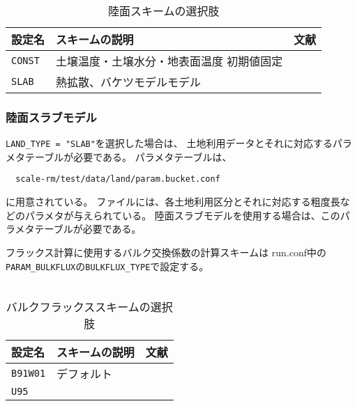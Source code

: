 \begin{table}[h]
\begin{center}
  \caption{陸面スキームの選択肢}
  \label{tab:nml_land}
  \begin{tabularx}{150mm}{lXX} \hline
    \rowcolor[gray]{0.9}  設定名 & スキームの説明 & 文献\\ \hline
      \verb|CONST| & 土壌温度・土壌水分・地表面温度 初期値固定 &  \\
      \verb|SLAB|  & 熱拡散、バケツモデルモデル   &  \\
    \hline
  \end{tabularx}
\end{center}
\end{table}



\subsubsection{陸面スラブモデル}
\verb|LAND_TYPE = "SLAB"|を選択した場合は、
土地利用データとそれに対応するパラメタテーブルが必要である。
パラメタテーブルは、
\begin{verbatim}
  scale-rm/test/data/land/param.bucket.conf
\end{verbatim}
に用意されている。
ファイルには、各土地利用区分とそれに対応する粗度長などのパラメタが与えられている。
陸面スラブモデルを使用する場合は、このパラメタテーブルが必要である。


フラックス計算に使用するバルク交換係数の計算スキームは 
run.conf中の\verb|PARAM_BULKFLUX|の\verb|BULKFLUX_TYPE|で設定する。\\

\\

\begin{table}[h]
\begin{center}
  \caption{バルクフラックススキームの選択肢}
  \label{tab:nml_bulk}
  \begin{tabularx}{150mm}{lXX} \hline
    \rowcolor[gray]{0.9}  設定名 & スキームの説明 & 文献\\ \hline
      \verb|B91W01| & デフォルト & \citet{beljaars_1991,wilson_2001}\\
      \verb|U95|    &            & \citet{uno_1995}\\
    \hline
  \end{tabularx}
\end{center}
\end{table}




